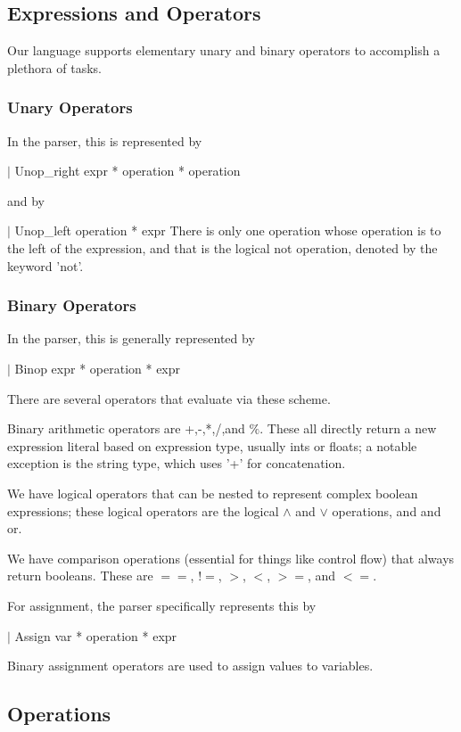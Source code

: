 \documentclass{article}
\begin{document}
\subsection{Expressions and Operators}
Our language supports elementary unary and binary operators to accomplish a plethora of tasks.
\subsubsection{Unary Operators}
In the parser, this is represented by 

$|$ Unop\_right expr * operation * operation

and by 

$|$ Unop\_left operation * expr
There is only one operation whose operation is to the left of the expression, and that is the logical not operation, denoted by the keyword 'not'. 
\subsubsection{Binary Operators}
In the parser, this is generally represented by

$|$ Binop expr * operation * expr

There are several operators that evaluate via these scheme.

Binary arithmetic operators are +,-,*,/,and $\%$. These all directly return a new expression literal based on expression type, usually ints or floats; a notable exception is the string type, which uses '+' for concatenation.

We have logical operators that can be nested to represent complex boolean expressions; these logical operators are the logical $\land$ and $\lor$ operations, and and or. 

We have comparison operations (essential for things like control flow) that always return booleans. These are $==$, $!=$, $>$, $<$, $>=$, and $<=$. 

For assignment, the parser specifically represents this by 

$|$ Assign var * operation * expr

Binary assignment operators are used to assign values to variables. 
\subsection{Operations}
    
\end{document}
